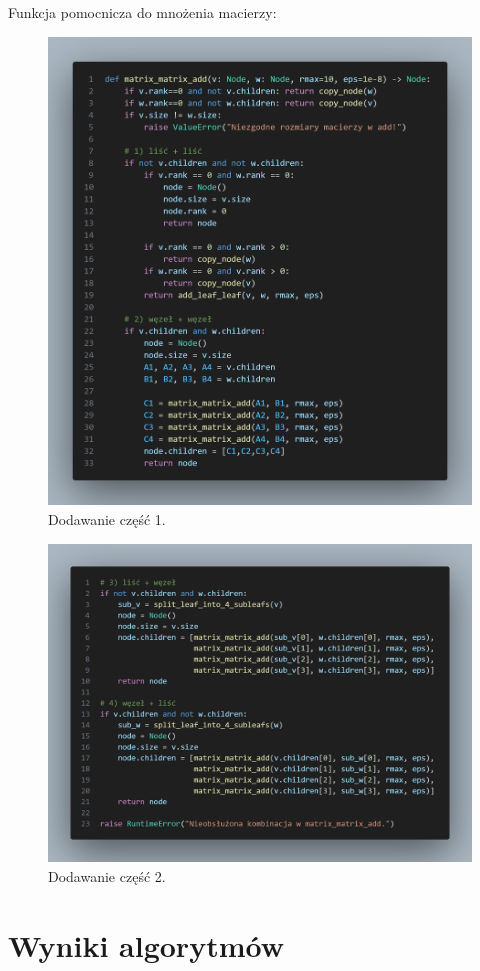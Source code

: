 \documentclass[11pt, leqno]{scrartcl}
\begin{document}
    \subsection*{}
    Funkcja pomocnicza do mnożenia macierzy:
    \begin{figure}[H]
        \centering
        \includegraphics[width=1\linewidth]{matrix_add1.png}
        \caption{Dodawanie część 1.}
    \end{figure}
    \begin{figure}[H]
        \centering
        \includegraphics[width=1\linewidth]{matrix_add2.png}
        \caption{Dodawanie część 2.}
    \end{figure}

    \section{Wyniki algorytmów}
\end{document}
